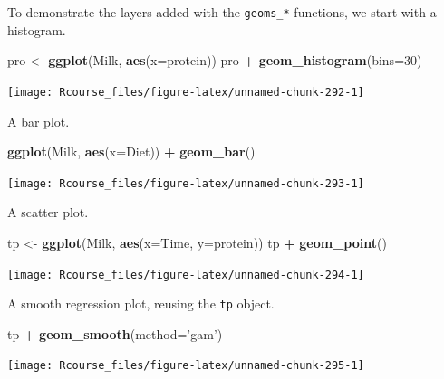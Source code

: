 \documentclass[]{book}
\newenvironment{Shaded}{\begin{snugshade}}{\end{snugshade}}
\newcommand{\KeywordTok}[1]{\textcolor[rgb]{0.13,0.29,0.53}{\textbf{#1}}}
\newcommand{\DataTypeTok}[1]{\textcolor[rgb]{0.13,0.29,0.53}{#1}}
\newcommand{\DecValTok}[1]{\textcolor[rgb]{0.00,0.00,0.81}{#1}}
\newcommand{\StringTok}[1]{\textcolor[rgb]{0.31,0.60,0.02}{#1}}
\newcommand{\OperatorTok}[1]{\textcolor[rgb]{0.81,0.36,0.00}{\textbf{#1}}}
\newcommand{\NormalTok}[1]{#1}
\theoremstyle{definition}
\theoremstyle{definition}
\theoremstyle{definition}
\theoremstyle{remark}
\begin{document}
To demonstrate the layers added with the \texttt{geoms\_*} functions, we
start with a histogram.

\begin{Shaded}
\begin{Highlighting}[]
\NormalTok{pro <-}\StringTok{ }\KeywordTok{ggplot}\NormalTok{(Milk, }\KeywordTok{aes}\NormalTok{(}\DataTypeTok{x=}\NormalTok{protein))}
\NormalTok{pro }\OperatorTok{+}\StringTok{ }\KeywordTok{geom_histogram}\NormalTok{(}\DataTypeTok{bins=}\DecValTok{30}\NormalTok{)}
\end{Highlighting}
\end{Shaded}

\texttt{[image: Rcourse\_files/figure-latex/unnamed-chunk-292-1]}

A bar plot.

\begin{Shaded}
\begin{Highlighting}[]
\KeywordTok{ggplot}\NormalTok{(Milk, }\KeywordTok{aes}\NormalTok{(}\DataTypeTok{x=}\NormalTok{Diet)) }\OperatorTok{+}
\StringTok{  }\KeywordTok{geom_bar}\NormalTok{()}
\end{Highlighting}
\end{Shaded}

\texttt{[image: Rcourse\_files/figure-latex/unnamed-chunk-293-1]}

A scatter plot.

\begin{Shaded}
\begin{Highlighting}[]
\NormalTok{tp <-}\StringTok{ }\KeywordTok{ggplot}\NormalTok{(Milk, }\KeywordTok{aes}\NormalTok{(}\DataTypeTok{x=}\NormalTok{Time, }\DataTypeTok{y=}\NormalTok{protein))}
\NormalTok{tp }\OperatorTok{+}\StringTok{ }\KeywordTok{geom_point}\NormalTok{()}
\end{Highlighting}
\end{Shaded}

\texttt{[image: Rcourse\_files/figure-latex/unnamed-chunk-294-1]}

A smooth regression plot, reusing the \texttt{tp} object.

\begin{Shaded}
\begin{Highlighting}[]
\NormalTok{tp }\OperatorTok{+}\StringTok{ }\KeywordTok{geom_smooth}\NormalTok{(}\DataTypeTok{method=}\StringTok{'gam'}\NormalTok{)}
\end{Highlighting}
\end{Shaded}

\texttt{[image: Rcourse\_files/figure-latex/unnamed-chunk-295-1]}
\end{document}
